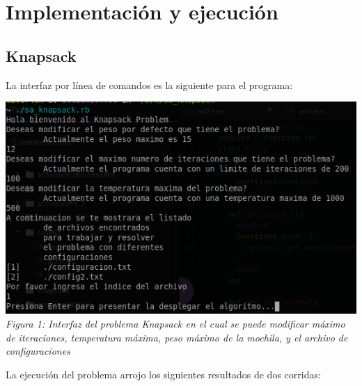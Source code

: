 \documentclass[10pt]{article}
\begin{document}
\section{Implementación y ejecución}
\subsection{Knapsack}
La interfaz por línea de comandos es la siguiente para el programa:
\begin{center}
  \includegraphics[scale=0.5]{imgs/int-knap.png}
  \\\textit{Figura 1: Interfaz del problema Knapsack en el cual se puede modificar máximo de iteraciones, temperatura máxima, peso máximo de la mochila, y el archivo de configuraciones}
\end{center}
La ejecución del problema arrojo los siguientes resultados de dos corridas:
\end{document}
